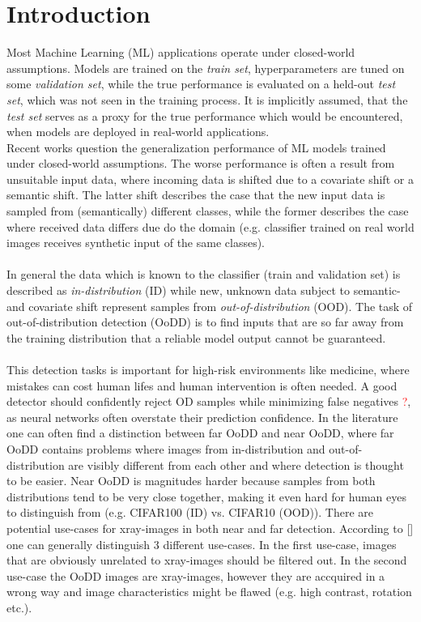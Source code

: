 \section{Introduction}
\raggedbottom
Most Machine Learning (ML) applications operate under closed-world assumptions.
Models are trained on the \textit{train set}, hyperparameters are tuned on some \textit{validation set}, while the true performance is evaluated on a held-out \textit{test set}, which was not seen in the training process.
It is implicitly assumed, that the \textit{test set} serves as a proxy for the true performance which would be encountered, when models are deployed in real-world applications.
\\
Recent works question the generalization performance of ML models trained under closed-world assumptions.
The worse performance is often a result from unsuitable input data, where incoming data is shifted due to a covariate shift or a semantic shift.
The latter shift describes the case that the new input data is sampled from (semantically) different classes, while the former describes the case where received data differs due do the domain (e.g. classifier trained on real world images receives synthetic input of the same classes).
\\
\\
In general the data which is known to the classifier (train and validation set) is described as \textit{in-distribution} (ID) while new, unknown data subject to semantic- and covariate shift represent samples from \textit{out-of-distribution} (OOD).
The task of out-of-distribution detection (OoDD) is to find inputs that are so far away from the training distribution that a reliable model output cannot be guaranteed.
\\
\\
This detection tasks is important for high-risk environments like medicine, where mistakes can cost human lifes and human intervention is often needed.
A good detector should confidently reject OD samples while minimizing false negatives \textcolor{red}{?}, as neural networks often overstate their prediction confidence.
In the literature one can often find a distinction between far OoDD and near OoDD, where far OoDD contains problems where images from in-distribution and out-of-distribution are visibly different from each other and where detection is thought to be easier.
Near OoDD is magnitudes harder because samples from both distributions tend to be very close together, making it even hard for human eyes to distinguish from (e.g. CIFAR100 (ID) vs. CIFAR10 (OOD)).
There are potential use-cases for xray-images in both near and far detection.
According to [] one can generally distinguish 3 different use-cases.
In the first use-case, images that are obviously unrelated to xray-images should be filtered out.
In the second use-case the OoDD images are xray-images, however they are accquired in a wrong way and image characteristics might be flawed (e.g. high contrast, rotation etc.).


